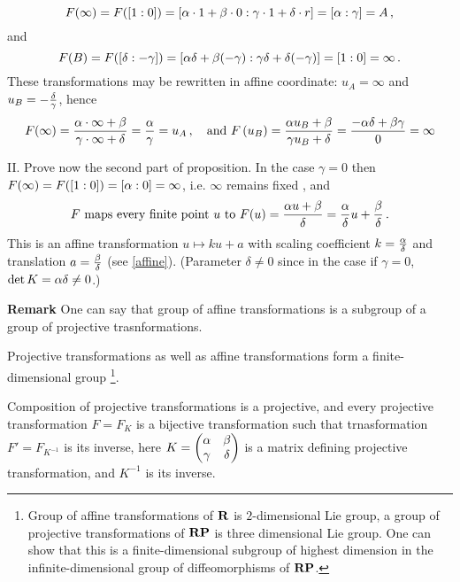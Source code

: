 \documentclass[12pt]{article}
\numberwithin{equation}{section}
\begin{document}
                 \begin{equation}\label{transactingoninfinity}
    F(\infty)=F([1:0])=[\alpha\cdot 1+\beta\cdot 0
                  : 
               \gamma \cdot 1+\delta\cdot r]=
            [\alpha:\gamma]=A\,,
                   \end{equation}
and
                  \begin{equation}\label{transssendingtoinfinity}
F(B)=F([\delta:-\gamma])=
     [\alpha\delta +\beta(-\gamma)
                 :
            \gamma\delta+\delta (-\gamma) ]=
             [1:0]=\infty\,.
                  \end{equation}
These transformations may be rewritten in affine coordinate:
$u_A=\infty$ and $u_B=-{\delta\over \gamma}$, hence
                 \begin{equation*}\label{transactingoninfinity1}
               F(\infty)={\alpha\cdot \infty+\beta
                   \over
               \gamma \cdot \infty+\delta}={\alpha\over \gamma}=u_A\,,
\quad {\rm and}\,\,
     F\left(u_B\right)=
     {\alpha u_B+\beta
                   \over
               \gamma u_B+\delta}=
             {-\alpha\delta+\beta\gamma\over 0}=\infty
                  \end{equation*}

\smallskip

II. Prove now the second part of proposition. 
In the case $\gamma=0$ then 
$F(\infty)=F([1:0])=[\alpha:0]=\infty$,
i.e. $\infty$ remains fixed , and
                       \begin{equation}
     \hbox{$F$ maps every finite point $u$ to }
   F(u)={\alpha u+\beta\over \delta}=
    {\alpha\over \delta}u+{\beta\over \delta}\,.
                        \end{equation} 
This is an affine transformation $u\mapsto ku+a$
with scaling coefficient $k={\alpha\over \delta}$
and translation $a={\beta\over \delta}$ (see \eqref{affine}).
(Parameter $\delta\not=0$ since in the case if $\gamma=0$,
$\det K=\alpha\delta\not=0$.)

{\footnotesize 

{\bf Remark }
One can say that group of affine transformations is a subgroup
of a group of projective trasnformations.

Projective transformations as well as affine 
transformations form a finite-dimensional group
\footnote{Group of affine transformations of ${\bf R}$
is $2$-dimensional Lie group, a group of
projective transformations of ${\bf R}{\bf P}$ is three dimensional Lie
group. One can show that this is a finite-dimensional
subgroup of highest dimension in the infinite-dimensional
group of diffeomorphisms of ${\bf R}{\bf P}$.}. 

Composition of projective transformations is 
a projective, and every projective transformation 
  $F=F_{K}$ is a bijective
transformation such that 
trnasformation $F'=F_{K^{-1}}$ is its inverse,
here 
$K=\begin{pmatrix}\alpha &\beta\cr\gamma &\delta\end{pmatrix}$
is a matrix defining projective transformation, and $K^{-1}$
is its inverse.




}
\end{document}
